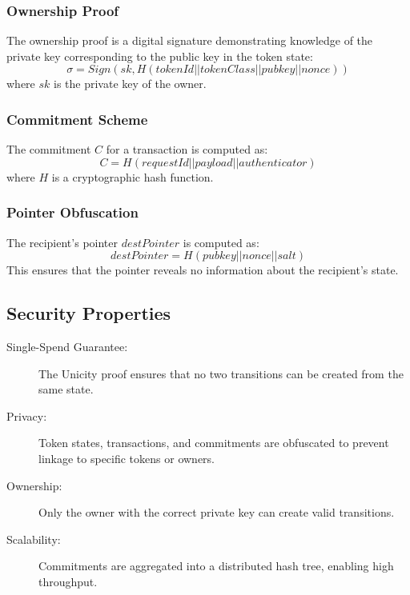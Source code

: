 \subsubsection{Ownership Proof}

The ownership proof is a digital signature demonstrating knowledge of the private key corresponding to the public key in the token state:
\[
\sigma = Sign(sk, H(tokenId || tokenClass || pubkey || nonce))
\]
where \( sk \) is the private key of the owner.


\subsubsection{Commitment Scheme}

The commitment \( C \) for a transaction is computed as:
\[
C = H(requestId || payload || authenticator)
\]
where \( H \) is a cryptographic hash function.

\subsubsection{Pointer Obfuscation}

The recipient's pointer \( destPointer \) is computed as:
\[
destPointer = H(pubkey || nonce || salt)
\]
This ensures that the pointer reveals no information about the recipient's state.


\subsection{Security Properties}

\begin{description}
  \item[Single-Spend Guarantee:] The Unicity proof ensures that no two transitions can be created from the same state.
  \item[Privacy:] Token states, transactions, and commitments are obfuscated to prevent linkage to specific tokens or owners.
  \item[Ownership:] Only the owner with the correct private key can create valid transitions.
  \item[Scalability:] Commitments are aggregated into a distributed hash tree, enabling high throughput.
\end{description}


